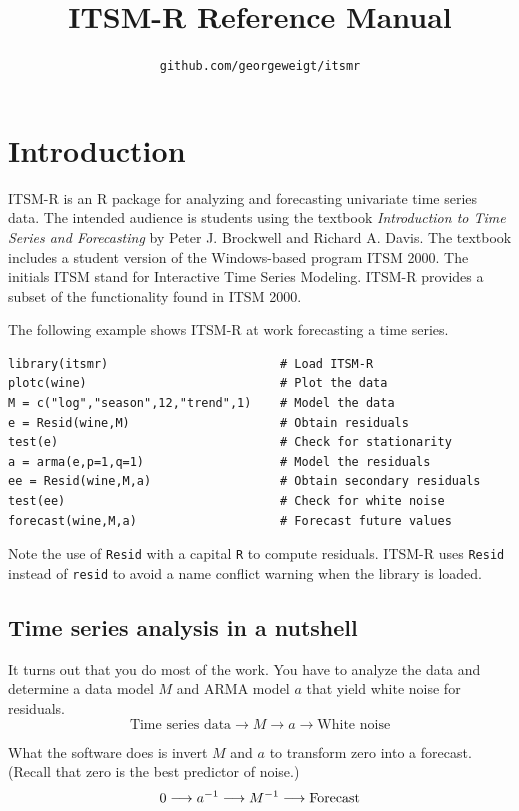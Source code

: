 \documentclass[12pt]{article}
\title{ITSM-R Reference Manual}
\author{\tt github.com/georgeweigt/itsmr}
\begin{document}
\maketitle
\newpage
\tableofcontents
\newpage

\section{Introduction}
ITSM-R is an R package for analyzing and forecasting univariate
time series data.
The intended audience is students using the textbook
{\it Introduction to Time Series and Forecasting}
by Peter J. Brockwell and Richard A. Davis.
The textbook includes a student version of the Windows-based program ITSM 2000.
The initials ITSM stand for Interactive Time Series Modeling.
ITSM-R provides a subset of the functionality found in ITSM 2000.

\bigskip
The following example shows ITSM-R at work forecasting a time series.

\begin{verbatim}
library(itsmr)                        # Load ITSM-R
plotc(wine)                           # Plot the data
M = c("log","season",12,"trend",1)    # Model the data
e = Resid(wine,M)                     # Obtain residuals
test(e)                               # Check for stationarity
a = arma(e,p=1,q=1)                   # Model the residuals
ee = Resid(wine,M,a)                  # Obtain secondary residuals
test(ee)                              # Check for white noise
forecast(wine,M,a)                    # Forecast future values
\end{verbatim}

Note the use of {\tt Resid} with a capital {\tt R} to compute residuals.
ITSM-R uses {\tt Resid} instead of {\tt resid} to avoid a name conflict
warning when the library is loaded.

\subsection{Time series analysis in a nutshell}
It turns out that you do most of the work.
You have to analyze the data and
determine a data model $M$ and ARMA model $a$
that yield white noise for residuals.
\[
\text{Time series data}
\longrightarrow M\longrightarrow a\longrightarrow
\text{White noise}
\]

What the software does is invert $M$ and $a$ to transform zero into a forecast.
(Recall that zero is the best predictor of noise.)
\[
0\longrightarrow a^{-1}\longrightarrow M^{-1}\longrightarrow{\rm Forecast}
\]
\end{document}
